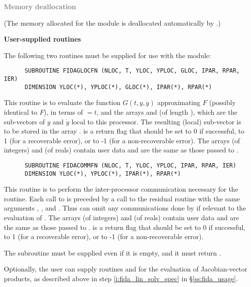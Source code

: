\begin{Steps}
\item \textcolor{gray}{\bf Memory deallocation}

  (The memory allocated for the {\fidabbd} module is deallocated automatically
  by .)


\item {\bf User-supplied routines}

  The following two routines must be supplied for use with the {\idabbdpre}
  module:
\begin{verbatim}
      SUBROUTINE FIDAGLOCFN (NLOC, T, YLOC, YPLOC, GLOC, IPAR, RPAR, IER)
      DIMENSION YLOC(*), YPLOC(*), GLOC(*), IPAR(*), RPAR(*)
\end{verbatim}
  This routine is to evaluate the function $G(t,y,\dot{y})$ approximating $F$
  (possibly identical to $F$), in terms of  $ = t$, and the arrays
   and  (of length ), which are the sub-vectors
  of $y$ and $\dot{y}$ local to this processor.  The resulting (local) sub-vector
  is to be stored in the array .   is a return flag that
  should be set to 0 if successful, to 1 (for a recoverable error), or to
  -1 (for a non-recoverable error).
  The arrays  (of integers) and  (of reals) contain user data
  and are the same as those passed to .

\begin{verbatim}
      SUBROUTINE FIDACOMMFN (NLOC, T, YLOC, YPLOC, IPAR, RPAR, IER)
      DIMENSION YLOC(*), YPLOC(*), IPAR(*), RPAR(*)
\end{verbatim}
  This routine is to perform the inter-processor communication necessary
  for the  routine.
  Each call to  is preceded by a call to the residual routine
   with the same arguments , , and .
  Thus  can omit any communications done by  if
  relevant to the evaluation of .
  The arrays  (of integers) and  (of reals) contain user data
  and are the same as those passed to .
   is a return flag that should be set to 0 if successful, to 1
  (for a recoverable error), or to -1 (for a non-recoverable error).

  {\warn}The subroutine  must be supplied even if it is empty,
  and it must return .

  Optionally, the user can supply routines  and
   for the evaluation of Jacobian-vector products, as
  described above in step \ref{i:fida_lin_solv_spec}
  in \S\ref{ss:fida_usage}.

\end{Steps}
